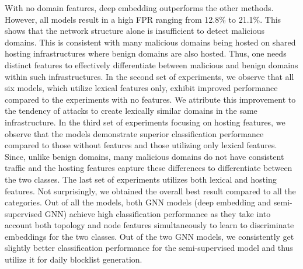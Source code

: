 With no domain features, deep embedding outperforms the other methods. However, all models result in a high FPR ranging from 12.8\% to 21.1\%. This shows that the network structure alone is insufficient to detect malicious domains. This is consistent with many malicious domains being hosted on shared hosting infrastructures where benign domains are also hosted. Thus, one needs distinct features to effectively differentiate between malicious and benign domains within such infrastructures. In the second set of experiments, we observe that all six models, which utilize lexical features only, exhibit improved performance compared to the experiments with no features. We attribute this improvement to the tendency of attacks to create lexically similar domains in the same infrastructure. In the third set of experiments focusing on hosting features, we observe that the models demonstrate superior classification performance compared to those without features and those utilizing only lexical features. Since, unlike benign domains, many malicious domains do not have consistent traffic and the hosting features capture these differences to differentiate between the two classes. The last set of experiments utilizes both lexical and hosting features. Not surprisingly, we obtained the overall best result compared to all the categories. Out of all the models, both GNN models (deep embedding and semi-supervised GNN) achieve high classification performance as they take into account both topology and node features simultaneously to learn to discriminate embeddings for the two classes. Out of the two GNN models, we consistently get slightly better classification performance for the semi-supervised model and thus utilize it for daily blocklist generation. 

